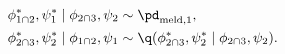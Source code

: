 \begin{align}
  \phi_{1 \cap 2}^{*}, \psi_{1}^{*} \mid \phi_{2 \cap 3}, \psi_{2} &\sim \pd_{\text{meld}, 1}, \\
  \phi_{2 \cap 3}^{*}, \psi_{2}^{*} \mid \phi_{1 \cap 2}, \psi_{1} &\sim \q(\phi_{2 \cap 3}^{*}, \psi_{2}^{*} \mid \phi_{2 \cap 3}, \psi_{2}).
  \label{eqn:stage-two-gibbs-updates}
\end{align}